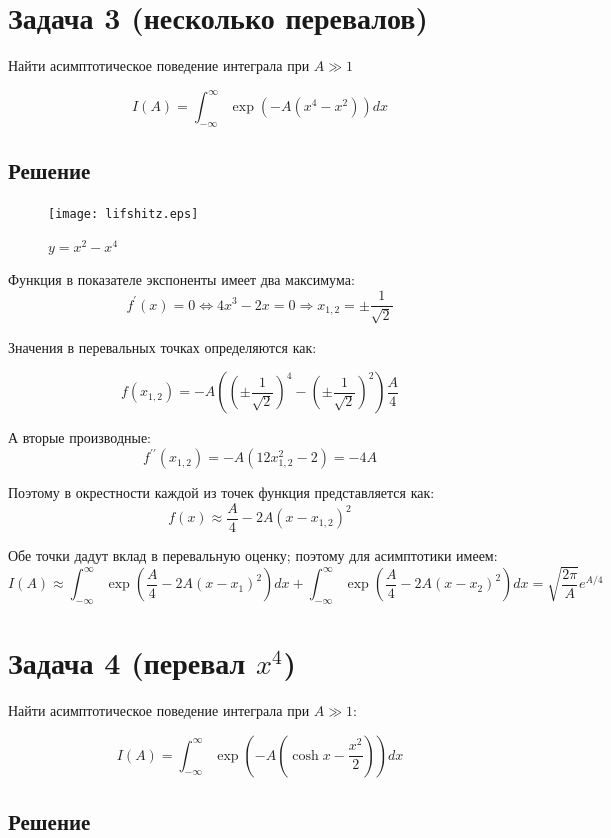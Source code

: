 \documentclass[a4paper,12pt]{article}
\begin{document}
\section{Задача 3 (несколько перевалов)}

Найти асимптотическое поведение интеграла при $A\gg1$

\[
I(A)=\int_{-\infty}^{\infty}\exp(-A(x^{4}-x^{2}))dx
\]



\subsection{Решение}

\begin{figure}[h]
	\caption{$y=x^{2}-x^{4}$}
	\centering
	\texttt{[image: lifshitz.eps]}
\end{figure}

\noindent
Функция в показателе экспоненты имеет два максимума: 
\[
f^{\prime}(x)=0\Leftrightarrow4x^{3}-2x=0\Rightarrow x_{1,2}=\pm\frac{1}{\sqrt{2}}
\]

\noindent
Значения в перевальных точках определяются как:

\[
f(x_{1,2})=-A\left(\left(\pm\frac{1}{\sqrt{2}}\right)^{4}-\left(\pm\frac{1}{\sqrt{2}}\right)^{2}\right)\frac{A}{4}
\]

\noindent
А вторые производные:
\[
f^{\prime\prime}(x_{1,2})=-A(12x_{1,2}^{2}-2)=-4A
\]

\noindent
Поэтому в окрестности каждой из точек функция представляется как:
\[
f(x)\approx\frac{A}{4}-2A(x-x_{1,2})^{2}
\]

\noindent
Обе точки дадут вклад в перевальную оценку; поэтому для асимптотики
имеем:
\[
I\left(A\right)\approx\int_{-\infty}^{\infty}\exp\left(\frac{A}{4}-2A(x-x_{1})^{2}\right)dx+\int_{-\infty}^{\infty}\exp\left(\frac{A}{4}-2A(x-x_{2})^{2}\right)dx=\sqrt{\frac{2\pi}{A}}e^{A/4}
\]



\section{Задача 4 (перевал $x^4$)}

Найти асимптотическое поведение интеграла при $A\gg1$:

\[
I\left(A\right)=\int_{-\infty}^{\infty}\exp\left(-A\left(\cosh x-\frac{x^{2}}{2}\right)\right)dx
\]



\subsection{Решение}
\end{document}
